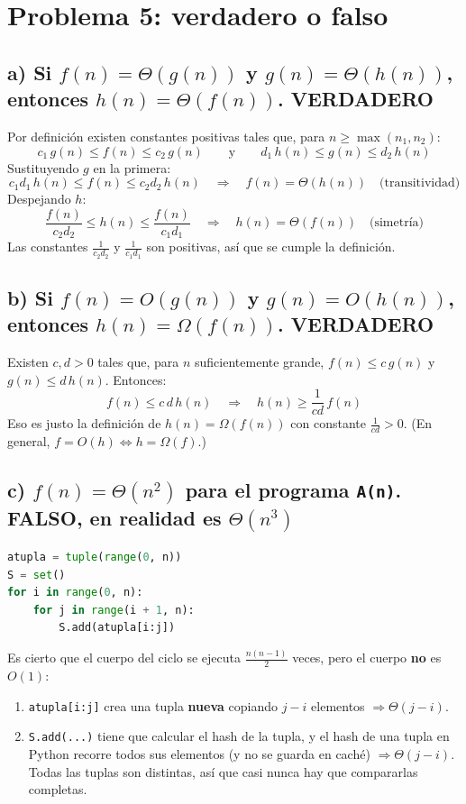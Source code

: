\documentclass[11pt]{article}
\newcommand{\res}[1]{\textcolor{azul}{\textbf{#1}}}
\begin{document}
\section*{Problema 5: verdadero o falso}

\subsection*{a) Si $f(n) = \Theta(g(n))$ y $g(n) = \Theta(h(n))$, entonces $h(n) = \Theta(f(n))$. \quad \res{VERDADERO}}

Por definición existen constantes positivas tales que, para $n \ge \max(n_1, n_2)$:
\[
  c_1\,g(n) \le f(n) \le c_2\,g(n)
  \qquad\text{y}\qquad
  d_1\,h(n) \le g(n) \le d_2\,h(n)
\]
Sustituyendo $g$ en la primera:
\[
  c_1 d_1\,h(n) \le f(n) \le c_2 d_2\,h(n) \quad\Rightarrow\quad f(n) = \Theta(h(n)) \quad\text{(transitividad)}
\]
Despejando $h$:
\[
  \frac{f(n)}{c_2 d_2} \le h(n) \le \frac{f(n)}{c_1 d_1} \quad\Rightarrow\quad h(n) = \Theta(f(n)) \quad\text{(simetría)}
\]
Las constantes $\frac{1}{c_2 d_2}$ y $\frac{1}{c_1 d_1}$ son positivas, así que se cumple la
definición.

\subsection*{b) Si $f(n) = O(g(n))$ y $g(n) = O(h(n))$, entonces $h(n) = \Omega(f(n))$. \quad \res{VERDADERO}}

Existen $c, d > 0$ tales que, para $n$ suficientemente grande, $f(n) \le c\,g(n)$ y
$g(n) \le d\,h(n)$. Entonces:
\[
  f(n) \le c\,d\,h(n) \quad\Rightarrow\quad h(n) \ge \frac{1}{cd}\,f(n)
\]
Eso es justo la definición de $h(n) = \Omega(f(n))$ con constante $\frac{1}{cd} > 0$.
(En general, $f = O(h) \iff h = \Omega(f)$.)

\subsection*{c) $f(n) = \Theta(n^2)$ para el programa \texttt{A(n)}. \quad \res{FALSO}, en realidad es $\Theta(n^3)$}

\begin{lstlisting}[language=Python]
atupla = tuple(range(0, n))
S = set()
for i in range(0, n):
    for j in range(i + 1, n):
        S.add(atupla[i:j])
\end{lstlisting}

Es cierto que el cuerpo del ciclo se ejecuta $\frac{n(n-1)}{2}$ veces, pero el cuerpo
\textbf{no} es $O(1)$:
\begin{enumerate}
  \item \texttt{atupla[i:j]} crea una tupla \textbf{nueva} copiando $j - i$ elementos
        $\Rightarrow \Theta(j - i)$.
  \item \texttt{S.add(...)} tiene que calcular el hash de la tupla, y el hash de una tupla en
        Python recorre todos sus elementos (y no se guarda en caché) $\Rightarrow \Theta(j - i)$.
        Todas las tuplas son distintas, así que casi nunca hay que compararlas completas.
\end{enumerate}
\end{document}

